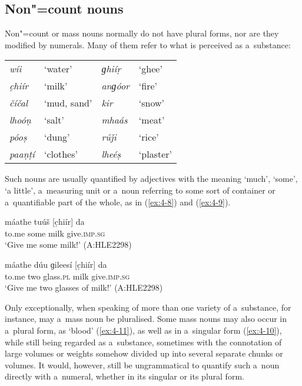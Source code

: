 \subsection{Non"=count nouns}
\label{subsec:4-4-1}


Non"=count or mass nouns normally do not have plural forms, nor are they modified by numerals. Many of them refer to what is perceived as a~substance:



\begin{table}[H]
\begin{tabularx}{\textwidth}{ Q Q Q Q }
\textit{wíi} &
`water' &
\textit{ɡhiíṛ} &
`ghee'\\
\textit{c̣hiír} &
`milk' &
\textit{anɡóor} &
`fire'\\
\textit{číčal} &
`mud, sand' &
\textit{kir} &
`snow'\\
\textit{lhoóṇ} &
`salt' &
\textit{mhaás} &
`meat'\\
\textit{póoṣ} &
`dung' &
\textit{rúǰi} &
`rice'\\
\textit{paaṇṭí} &
`clothes' &
\textit{lheéṣ} &
`plaster'\\
\end{tabularx}
\end{table}

Such nouns are usually quantified by adjectives with the meaning `much', `some', `a little', a~measuring unit or a~noun referring to some sort of container or a~quantifiable part of the whole, as in (\ref{ex:4-8}) and (\ref{ex:4-9}). 

\begin{exe}
\ex
\label{ex:4-8}
\gll máathe tuúš [c̣hiír] da \\
	to.me some milk give.\textsc{imp.sg} \\
\glt `Give me some milk!' (A:HLE2298)
\end{exe}

\begin{exe}
\ex
\label{ex:4-9}
\gll máathe dúu ɡileesí [c̣hiír] da \\
	to.me two glass.\textsc{pl} milk give.\textsc{imp.sg} \\
\glt `Give me two glasses of milk!' (A:HLE2298)
\end{exe}

Only exceptionally, when speaking of more than one variety of a~substance, for instance, may a~mass noun be pluralised. Some mass nouns may also occur in a~plural form, as `blood' (\ref{ex:4-11}), as well as in a~singular form (\ref{ex:4-10}), while still being regarded as a~substance, sometimes with the connotation of large volumes or weights somehow divided up into several separate chunks or volumes. It would, however, still be ungrammatical to quantify such a~noun directly with a~numeral, whether in its singular or its plural form.


